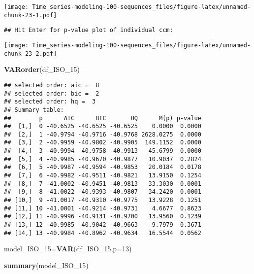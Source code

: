 \documentclass[
]{article}
\newenvironment{Shaded}{\begin{snugshade}}{\end{snugshade}}
\newcommand{\AttributeTok}[1]{\textcolor[rgb]{0.13,0.29,0.53}{#1}}
\newcommand{\DecValTok}[1]{\textcolor[rgb]{0.00,0.00,0.81}{#1}}
\newcommand{\FunctionTok}[1]{\textcolor[rgb]{0.13,0.29,0.53}{\textbf{#1}}}
\newcommand{\NormalTok}[1]{#1}
\newcommand{\OtherTok}[1]{\textcolor[rgb]{0.56,0.35,0.01}{#1}}
\begin{document}
\texttt{[image: Time\_series-modeling-100-sequences\_files/figure-latex/unnamed-chunk-23-1.pdf]}

\begin{verbatim}
## Hit Enter for p-value plot of individual ccm:
\end{verbatim}

\texttt{[image: Time\_series-modeling-100-sequences\_files/figure-latex/unnamed-chunk-23-2.pdf]}

\begin{Shaded}
\begin{Highlighting}[]
\FunctionTok{VARorder}\NormalTok{(df\_ISO\_15)}
\end{Highlighting}
\end{Shaded}

\begin{verbatim}
## selected order: aic =  8 
## selected order: bic =  2 
## selected order: hq =  3 
## Summary table:  
##        p      AIC      BIC       HQ      M(p) p-value
##  [1,]  0 -40.6525 -40.6525 -40.6525    0.0000  0.0000
##  [2,]  1 -40.9794 -40.9716 -40.9768 2628.0275  0.0000
##  [3,]  2 -40.9959 -40.9802 -40.9905  149.1152  0.0000
##  [4,]  3 -40.9994 -40.9758 -40.9913   45.6799  0.0000
##  [5,]  4 -40.9985 -40.9670 -40.9877   10.9037  0.2824
##  [6,]  5 -40.9987 -40.9594 -40.9853   20.0184  0.0178
##  [7,]  6 -40.9982 -40.9511 -40.9821   13.9150  0.1254
##  [8,]  7 -41.0002 -40.9451 -40.9813   33.3030  0.0001
##  [9,]  8 -41.0022 -40.9393 -40.9807   34.2420  0.0001
## [10,]  9 -41.0017 -40.9310 -40.9775   13.9228  0.1251
## [11,] 10 -41.0001 -40.9214 -40.9731    4.6677  0.8623
## [12,] 11 -40.9996 -40.9131 -40.9700   13.9560  0.1239
## [13,] 12 -40.9985 -40.9042 -40.9663    9.7979  0.3671
## [14,] 13 -40.9984 -40.8962 -40.9634   16.5544  0.0562
\end{verbatim}

\begin{Shaded}
\begin{Highlighting}[]
\NormalTok{model\_ISO\_15}\OtherTok{=}\FunctionTok{VAR}\NormalTok{(df\_ISO\_15,}\AttributeTok{p=}\DecValTok{13}\NormalTok{)}
\end{Highlighting}
\end{Shaded}

\begin{Shaded}
\begin{Highlighting}[]
\FunctionTok{summary}\NormalTok{(model\_ISO\_15)}
\end{Highlighting}
\end{Shaded}
\end{document}
